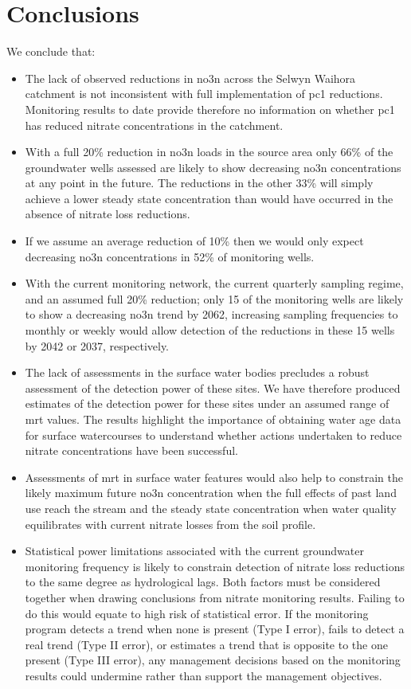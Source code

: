 \pagebreak
\section[Conclusions]{Conclusions} \label{sec:conclusions}

We conclude that:
\begin{itemize}
    \item The lack of observed reductions in \gls{no3n} across the Selwyn Waihora catchment is not inconsistent with full implementation of \gls{pc1} reductions. Monitoring results to date provide therefore no information on whether \gls{pc1} has reduced nitrate concentrations in the catchment.
    \item With a full 20\% reduction in \gls{no3n} loads in the source area only 66\% of the groundwater wells assessed are likely to show decreasing \gls{no3n} concentrations at any point in the future. The reductions in the other 33\% will simply achieve a lower steady state concentration than would have occurred in the absence of nitrate loss reductions.
    \item If we assume an average reduction of 10\% then we would only expect decreasing \gls{no3n} concentrations in 52\% of monitoring wells.
    \item With the current monitoring network, the current quarterly sampling regime, and an assumed full 20\% reduction; only 15 of the monitoring wells are likely to show a decreasing \gls{no3n} trend by 2062, increasing sampling frequencies to monthly or weekly would allow detection of the reductions in these 15 wells by 2042 or 2037, respectively.
    \item The lack of  assessments in the surface water bodies precludes a robust assessment of the detection power of these sites. We have therefore produced estimates of the detection power for these sites under an assumed range of \gls{mrt} values. The results highlight the importance of obtaining water age data for surface watercourses to understand whether actions undertaken to reduce nitrate concentrations have been successful.
    \item Assessments of \gls{mrt} in surface water features would also help to constrain the likely maximum future \gls{no3n} concentration when the full effects of past land use reach the stream and the steady state concentration when water quality equilibrates with current nitrate losses from the soil profile.
    \item Statistical power limitations associated with the current groundwater monitoring frequency is likely to constrain detection of nitrate loss reductions to the same degree as hydrological lags. Both factors must be considered together when drawing conclusions from nitrate monitoring results. Failing to do this would equate to high risk of statistical error. If the monitoring program detects a trend when none is present (Type I error), fails to detect a real trend (Type II error), or estimates a trend that is opposite to the one present (Type III error), any management decisions based on the monitoring results could undermine rather than support the management objectives.

\end{itemize}

